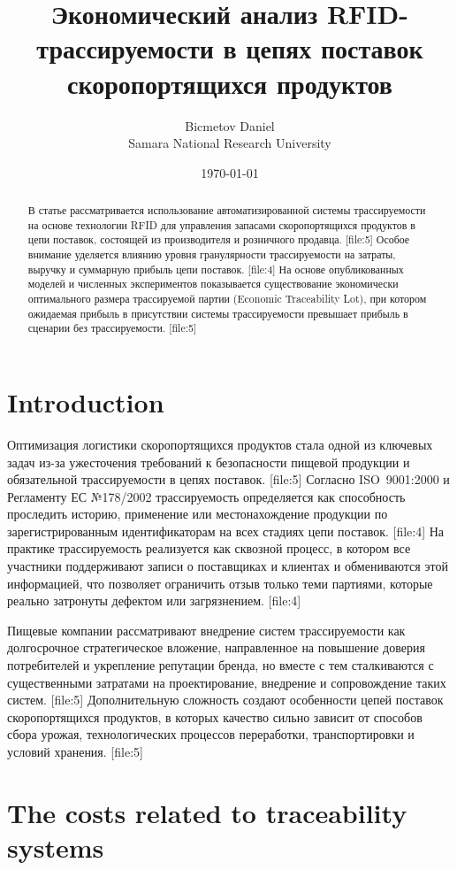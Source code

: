 \documentclass[eng]{ajceam-class}
\title{Экономический анализ RFID-трассируемости в цепях поставок скоропортящихся продуктов}
\author{Bicmetov Daniel\\Samara National Research University}
\date{\today}
\begin{document}
\maketitle

\begin{abstract}
В статье рассматривается использование автоматизированной системы трассируемости на основе технологии RFID для управления запасами скоропортящихся продуктов в цепи поставок, состоящей из производителя и розничного продавца. [file:5] Особое внимание уделяется влиянию уровня гранулярности трассируемости на затраты, выручку и суммарную прибыль цепи поставок. [file:4] На основе опубликованных моделей и численных экспериментов показывается существование экономически оптимального размера трассируемой партии (Economic Traceability Lot), при котором ожидаемая прибыль в присутствии системы трассируемости превышает прибыль в сценарии без трассируемости. [file:5]
\end{abstract}

\section{Introduction}

Оптимизация логистики скоропортящихся продуктов стала одной из ключевых задач из-за ужесточения требований к безопасности пищевой продукции и обязательной трассируемости в цепях поставок. [file:5] Согласно ISO~9001:2000 и Регламенту ЕС №178/2002 трассируемость определяется как способность проследить историю, применение или местонахождение продукции по зарегистрированным идентификаторам на всех стадиях цепи поставок. [file:4] На практике трассируемость реализуется как сквозной процесс, в котором все участники поддерживают записи о поставщиках и клиентах и обмениваются этой информацией, что позволяет ограничить отзыв только теми партиями, которые реально затронуты дефектом или загрязнением. [file:4]

Пищевые компании рассматривают внедрение систем трассируемости как долгосрочное стратегическое вложение, направленное на повышение доверия потребителей и укрепление репутации бренда, но вместе с тем сталкиваются с существенными затратами на проектирование, внедрение и сопровождение таких систем. [file:5] Дополнительную сложность создают особенности цепей поставок скоропортящихся продуктов, в которых качество сильно зависит от способов сбора урожая, технологических процессов переработки, транспортировки и условий хранения. [file:5]

\section{The costs related to traceability systems}
\end{document}
